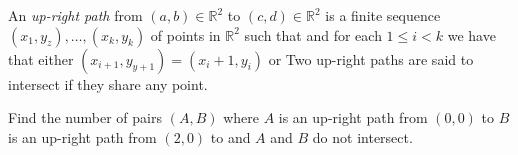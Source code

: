 An \textit{up-right path} from $(a, b) \in \mathbb{R}^2$ to $(c, d) \in \mathbb{R}^2$ is a finite sequence $(x_1, y_z), \dots, (x_k, y_k)$ of points in $ \mathbb{R}^2 $ such that  and for each $1 \le i < k$ we have that either $(x_{i+1}, y_{y+1}) = (x_i+1, y_i)$ or  Two up-right paths are said to intersect if they share any point.

Find the number of pairs $(A, B)$ where $A$ is an up-right path from $(0, 0)$ to  $B$ is an up-right path from $(2, 0)$ to  and $A$ and $B$ do not intersect.